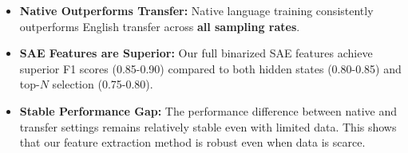 \begin{itemize}\itemsep=-1.7pt
    \item \textbf{Native Outperforms Transfer:} Native language training consistently outperforms English transfer across \textbf{all sampling rates}.
    \item \textbf{SAE Features are Superior:} Our full binarized SAE features achieve superior F1 scores (0.85-0.90) compared to both hidden states (0.80-0.85) and top-$N$ selection (0.75-0.80).
    \item \textbf{Stable Performance Gap:} The performance difference between native and transfer settings remains relatively stable even with limited data. This shows that our feature extraction method is robust even when data is scarce.
\end{itemize}

